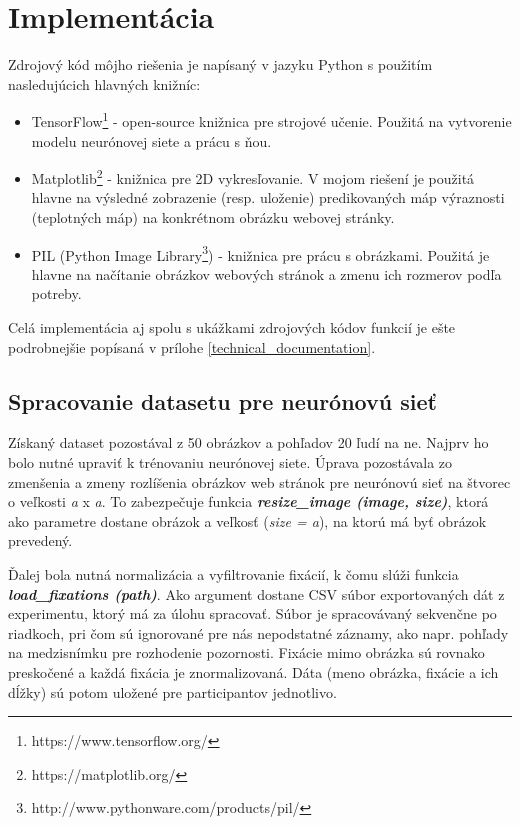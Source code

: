 \newpage

\section{Implementácia}
\label{implement}
Zdrojový kód môjho riešenia je napísaný v jazyku Python s použitím nasledujúcich hlavných knižníc:
\begin{itemize}
	\item TensorFlow\footnote{https://www.tensorflow.org/} - open-source knižnica pre strojové učenie. Použitá na vytvorenie modelu neurónovej siete a prácu s ňou.
	\item Matplotlib\footnote{https://matplotlib.org/} - knižnica pre 2D vykresľovanie. V mojom riešení je použitá hlavne na výsledné zobrazenie (resp. uloženie) predikovaných máp výraznosti (teplotných máp) na konkrétnom obrázku webovej stránky. 
	\item PIL (Python Image Library\footnote{http://www.pythonware.com/products/pil/}) - knižnica pre prácu s obrázkami. Použitá je hlavne na načítanie obrázkov webových stránok a zmenu ich rozmerov podľa potreby. 
\end{itemize}

Celá implementácia aj spolu s ukážkami zdrojových kódov funkcií je ešte podrobnejšie popísaná v prílohe \ref{technical_documentation}.

\subsection{Spracovanie datasetu pre neurónovú sieť}

Získaný dataset pozostával z 50 obrázkov a pohľadov 20 ľudí na ne. Najprv ho  bolo nutné upraviť k trénovaniu neurónovej siete. Úprava pozostávala zo zmenšenia a zmeny rozlíšenia obrázkov web stránok pre neurónovú sieť na štvorec o veľkosti \textit{a} x \textit{a}. To zabezpečuje funkcia \textit{\textbf{resize\_image (image, size)}}, ktorá ako parametre dostane obrázok a veľkosť (\textit{size = a}), na ktorú má byť obrázok prevedený.

Ďalej bola nutná normalizácia a vyfiltrovanie fixácií, k čomu slúži funkcia \textit{\textbf{load\_fixations (path)}}. Ako argument dostane CSV súbor exportovaných dát z experimentu, ktorý má za úlohu spracovať. Súbor je spracovávaný sekvenčne po riadkoch, pri čom sú ignorované pre nás nepodstatné záznamy, ako napr. pohľady na medzisnímku pre rozhodenie pozornosti. Fixácie mimo obrázka sú rovnako preskočené a každá fixácia je znormalizovaná. Dáta (meno obrázka, fixácie a ich dĺžky) sú potom uložené pre participantov jednotlivo. 

